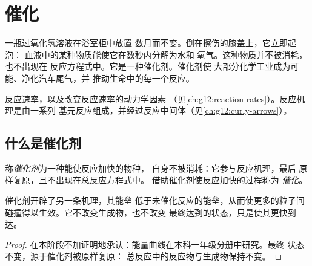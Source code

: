 \chapter{催化}\label{ch:g12:catalysis}

一瓶过氧化氢溶液在浴室柜中放置
数月而不变。倒在擦伤的膝盖上，它立即起泡：
血液中的某种物质能使它在数秒内分解为水和
氧气。这种物质并不被消耗，也不出现在
反应方程式中。它是一种催化剂。催化剂使
大部分化学工业成为可能、净化汽车尾气，并
推动生命中的每一个反应。

\begin{recall}
反应速率，以及改变反应速率的动力学因素
（见\cref{ch:g12:reaction-rates}）。反应机理是由一系列
基元反应组成，并经过反应中间体（见\cref{ch:g12:curly-arrows}）。
\end{recall}

\section{什么是催化剂}

\begin{definition}[催化剂，催化]\label{def:g12:catalysis:catalyst}
称\emph{催化剂}为一种能使反应加快的物种，
自身不被消耗：它参与反应机理，最后
原样复原，且不出现在总反应方程式中。
借助催化剂使反应加快的过程称为
\emph{催化}。
\end{definition}

\begin{proposition}\label{prop:g12:catalysis:path}
催化剂开辟了另一条机理，其能垒
低于未催化反应的能垒，从而使更多的粒子间
碰撞得以生效。它不改变生成物，也不改变
最终达到的状态，只是使其更快到达。
\end{proposition}

\begin{proof}
在本阶段不加证明地承认：能量曲线在本科一年级分册中研究。最终
状态不变，源于催化剂被原样复原：
总反应中的反应物与生成物保持不变。
\end{proof}

